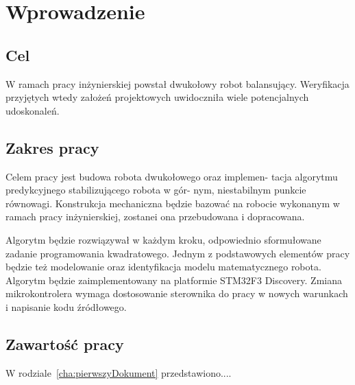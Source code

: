 \chapter{Wprowadzenie}
\label{cha:wprowadzenie}

\section{Cel}

W ramach pracy inżynierskiej powstał dwukołowy robot balansujący. Weryfikacja przyjętych wtedy założeń projektowych uwidoczniła wiele potencjalnych udoskonaleń.

\section{Zakres pracy}

Celem pracy jest budowa robota dwukołowego oraz implemen-
tacja algorytmu predykcyjnego stabilizującego robota w gór-
nym, niestabilnym punkcie równowagi. Konstrukcja mechaniczna będzie bazować na robocie wykonanym w ramach pracy inżynierskiej, zostanei ona przebudowana i dopracowana.

Algorytm będzie rozwiązywał w każdym kroku, odpowiednio sformułowane zadanie
programowania kwadratowego. Jednym z podstawowych elementów pracy będzie też modelowanie oraz identyfikacja modelu matematycznego robota. Algorytm będzie zaimplementowany na platformie STM32F3 Discovery. Zmiana mikrokontrolera wymaga dostosowanie sterownika do pracy w nowych warunkach i napisanie kodu źródłowego. 





\section{Zawartość pracy}
\label{sec:zawartoscPracy}

W rodziale~\ref{cha:pierwszyDokument} przedstawiono....


















